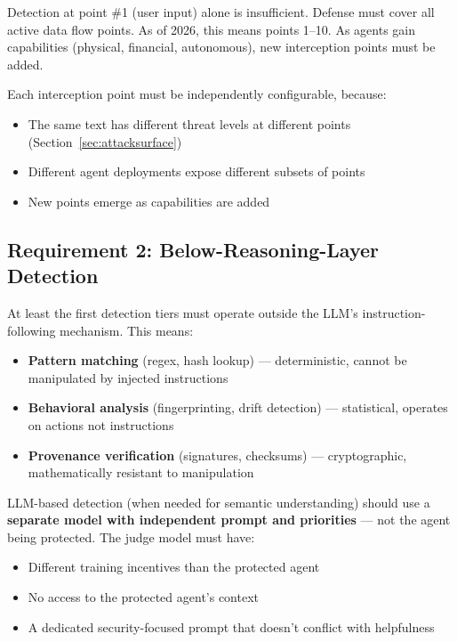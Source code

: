 \documentclass[11pt,letterpaper]{article}
\begin{document}
Detection at point \#1 (user input) alone is insufficient. Defense must cover all active data flow points. As of 2026, this means points 1--10. As agents gain capabilities (physical, financial, autonomous), new interception points must be added.

Each interception point must be independently configurable, because:

\begin{itemize}
\item The same text has different threat levels at different points (Section~\ref{sec:attacksurface})
\item Different agent deployments expose different subsets of points
\item New points emerge as capabilities are added
\end{itemize}

\subsection{Requirement 2: Below-Reasoning-Layer Detection}

At least the first detection tiers must operate outside the LLM's instruction-following mechanism. This means:

\begin{itemize}
\item \textbf{Pattern matching} (regex, hash lookup) --- deterministic, cannot be manipulated by injected instructions
\item \textbf{Behavioral analysis} (fingerprinting, drift detection) --- statistical, operates on actions not instructions
\item \textbf{Provenance verification} (signatures, checksums) --- cryptographic, mathematically resistant to manipulation
\end{itemize}

LLM-based detection (when needed for semantic understanding) should use a \textbf{separate model with independent prompt and priorities} --- not the agent being protected. The judge model must have:

\begin{itemize}
\item Different training incentives than the protected agent
\item No access to the protected agent's context
\item A dedicated security-focused prompt that doesn't conflict with helpfulness
\end{itemize}
\end{document}
